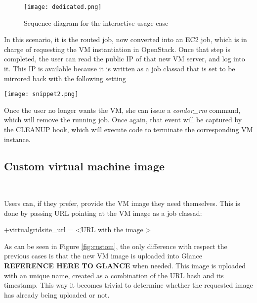 \documentclass[a4paper]{jpconf}
\begin{document}
\begin{figure}[h]
    \centering
    \texttt{[image: dedicated.png]}
    \caption{Sequence diagram for the interactive usage case}
    \label{fig:interactive}
\end{figure}

In this scenario, it is the routed job, now converted into an EC2 job, 
which is in charge of requesting the VM instantiation in OpenStack.
Once that step is completed, the user can read the public IP of that new VM server, and log into it. 
This IP is available because it is written as a job classad that is set to be
mirrored back with the following setting

\begin{snippet}[h]
    \centering
    \renewcommand\figurename{Snippet}
    \texttt{[image: snippet2.png]}
    \caption{Snippet 2}
    \label{fig:snippet2}
\end{snippet}


Once the user no longer wants the VM, she can issue a \textit{condor\_rm}
command, which will remove the running job. 
Once again, that event will be captured by the CLEANUP hook, which will execute
code to terminate the corresponding VM instance.


\subsection{Custom virtual machine image}

~

Users can, if they prefer, provide the VM image they need themselves. 
This is done by passing URL pointing at the VM image as a job classad:
\begin{center}
    +virtualgridsite\_url = \textless URL with the image \textgreater
\end{center}

As can be seen in Figure \ref{fig:custom}, 
the only difference with respect the previous cases is that the new VM image is uploaded into Glance \textbf{REFERENCE HERE TO GLANCE} when needed.
This image is uploaded with an unique name, 
created as a combination of the URL hash and its timestamp. 
This way it becomes trivial to determine whether the requested image has already being uploaded or not. 
\end{document}
